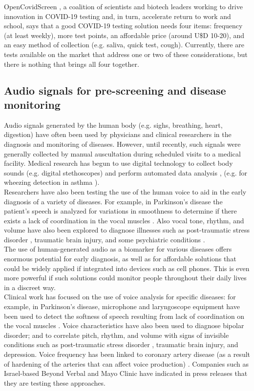 \documentclass{nle}
\begin{document}
OpenCovidScreen \cite{17}, a coalition of scientists and biotech leaders working to drive innovation in COVID-19 testing and, in turn, accelerate return to work and school, says that  a good COVID-19 testing solution needs four items: frequency (at least weekly), more test points, an affordable price (around U\$D 10-20), and an easy method of collection (e.g. saliva, quick test, cough). Currently, there are tests available on the market that address one or two of these considerations, but there is nothing that brings all four together.

\subsection{Audio signals for pre-screening and disease monitoring}

Audio signals generated by the human body (e.g. sighs, breathing, heart, digestion) have often been used by physicians and clinical researchers in the diagnosis and monitoring of diseases. However, until recently, such signals were generally collected by manual auscultation during scheduled visits to a medical facility. Medical research has begun to use digital technology to collect body sounds (e.g. digital stethoscopes) and perform automated data analysis \cite{1}, (e.g. for wheezing detection in asthma \cite{2} \cite{3}).\\

Researchers have also been testing the use of the human voice to aid in the early diagnosis of a variety of diseases. For example, in Parkinson's disease the patient’s speech is analyzed for variations in smoothness to determine if there exists a lack of coordination in the vocal muscles \cite{4} \cite{5}. Also vocal tone, rhythm, and volume have also been explored to diagnose  illnesses such as post-traumatic stress disorder \cite{7}, traumatic brain injury, and some psychiatric conditions \cite{8}.\\

The use of human-generated audio as a biomarker for various diseases offers enormous potential for early diagnosis, as well as for affordable solutions that could be widely applied if integrated into devices such as cell phones. This is even more powerful if such solutions could monitor people throughout their daily lives in a discreet way.\\

Clinical work has focused on the use of voice analysis for specific diseases: for example, in Parkinson's disease, microphone and laryngoscope equipment have been used to detect the softness of speech resulting from lack of coordination on the vocal muscles \cite{6} \cite{12}. Voice characteristics have also been used to diagnose bipolar disorder; and to correlate pitch, rhythm, and volume with signs of invisible conditions such as post-traumatic stress disorder \cite{7}, traumatic brain injury, and depression. Voice frequency has been linked to coronary artery disease (as a result of hardening of the arteries that can affect voice production) \cite{6}. Companies such as Israel-based Beyond Verbal and Mayo Clinic have indicated in press releases that they are testing these approaches.\\
\end{document}
